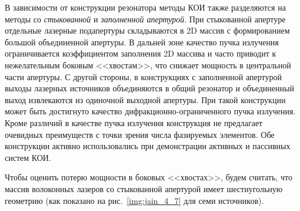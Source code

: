 В зависимости от конструкции резонатора методы КОИ также разделяются на методы со \textit{стыкованной} и \textit{заполненной апертурой}. При стыкованной апертуре отдельные лазерные подапертуры складываются в 2D массив с  формированием большой объединенной апертуры. В дальней зоне качество пучка излучения ограничивается коэффициентом заполнения 2D массива и часто приводит к нежелательным боковым <<хвостам>>, что снижает мощность в центральной части апертуры. С другой стороны, в конструкциях с заполненной апертурой выходы лазерных источников объединяются в общий резонатор и объединенный выход извлекаются из одиночной выходной апертуры. При такой конструкции может быть достигнуто качество дифракционно-ограниченного пучка излучения. Кроме различий в качестве пучка излучения конструкция не предлагает очевидных преимуществ с точки зрения числа фазируемых элементов. Обе конструкции активно использовались при демонстрации активных и пассивных систем КОИ.

Чтобы оценить потерю мощности в боковых <<хвостах>>, будем считать, что массив волоконных лазеров со стыкованной апертурой имеет шестиугольную геометрию (как показано на рис.~\ref{img:jain_4_7} для семи источников).

